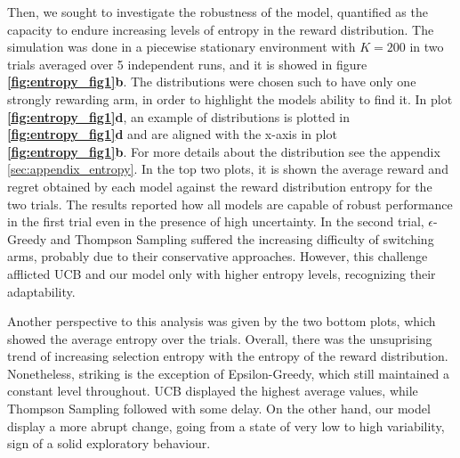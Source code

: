 \noindent Then, we sought to investigate the robustness of the model, quantified as the capacity to endure increasing levels of entropy in the reward distribution.
The simulation was done in a piecewise stationary environment with $K=200$ in two trials averaged over 5 independent runs, and it is showed in figure \textbf{\ref{fig:entropy_fig1}b}.
The distributions were chosen such to have only one strongly rewarding arm, in order to highlight the models ability to find it.
In plot \textbf{\ref{fig:entropy_fig1}d}, an example of distributions is plotted in \textbf{\ref{fig:entropy_fig1}d} and are aligned with the x-axis in plot \textbf{\ref{fig:entropy_fig1}b}.
For more details about the distribution see the appendix \ref{sec:appendix_entropy}.
In the top two plots, it is shown the average reward and regret obtained by each model against the reward distribution entropy for the two trials.
The results reported how all models are capable of robust performance in the first trial even in the presence of high uncertainty.
In the second trial, $\epsilon$-Greedy and Thompson Sampling suffered the increasing difficulty of switching arms, probably due to their conservative approaches. However, this challenge afflicted UCB and our model only with higher entropy levels, recognizing their adaptability.

Another perspective to this analysis was given by the two bottom plots, which showed the average entropy over the trials.
Overall, there was the unsuprising trend of increasing selection entropy with the entropy of the reward distribution. Nonetheless, striking is the exception of Epsilon-Greedy, which still maintained a constant level throughout.
UCB displayed the highest average values, while Thompson Sampling followed with some delay.
On the other hand, our model display a more abrupt change, going from a state of very low to high variability, sign of a solid exploratory behaviour.



